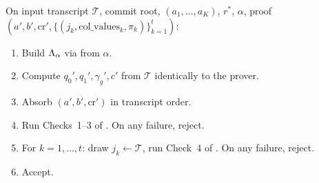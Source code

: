 \begin{construction}
\label{cons:verifier}
On input transcript $\mathcal{T}$, commit root, $(a_1, \ldots, a_K)$,
$r^*$, $\alpha$, proof $(a', b', \mathrm{cr}', \{(j_k,
\mathrm{col\_values}_k, \pi_k)\}_{k=1}^{t})$:
\begin{enumerate}[leftmargin=2em]
  \item Build $\Lambda_{\alpha}$ via  from $\alpha$.
  \item Compute $q_0', q_1', \gamma_g', c'$ from $\mathcal{T}$
    identically to the prover.
  \item Absorb $(a', b', \mathrm{cr}')$ in transcript order.
  \item Run Checks~1--3 of . On any failure, reject.
  \item For $k = 1, \ldots, t$: draw $j_k \leftarrow \mathcal{T}$, run
    Check~4 of . On any failure, reject.
  \item Accept.
\end{enumerate}
\end{construction}

